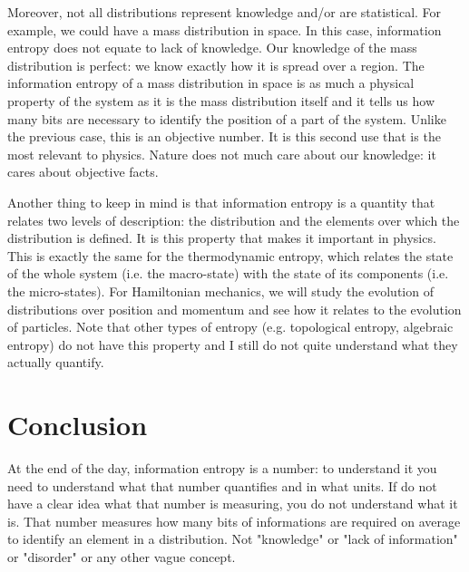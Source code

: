 \documentclass[aps,pra,10pt,floatfix,nofootinbib]{revtex4-1}
\theoremstyle{definition}
\begin{document}
Moreover, not all distributions represent knowledge and/or are statistical. For example, we could have a mass distribution in space. In this case, information entropy does not equate to lack of knowledge. Our knowledge of the mass distribution is perfect: we know exactly how it is spread over a region. The information entropy of a mass distribution in space is as much a physical property of the system as it is the mass distribution itself and it tells us how many bits are necessary to identify the position of a part of the system. Unlike the previous case, this is an objective number. It is this second use that is the most relevant to physics. Nature does not much care about our knowledge: it cares about objective facts.

Another thing to keep in mind is that information entropy is a quantity that relates two levels of description: the distribution and the elements over which the distribution is defined. It is this property that makes it important in physics. This is exactly the same for the thermodynamic entropy, which relates the state of the whole system (i.e. the macro-state) with the state of its components (i.e. the micro-states). For Hamiltonian mechanics, we will study the evolution of distributions over position and momentum and see how it relates to the evolution of particles. Note that other types of entropy (e.g. topological entropy, algebraic entropy) do not have this property and I still do not quite understand what they actually quantify.

\section{Conclusion}

At the end of the day, information entropy is a number: to understand it you need to understand what that number quantifies and in what units. If do not have a clear idea what that number is measuring, you do not understand what it is. That number measures how many bits of informations are required on average to identify an element in a distribution. Not "knowledge" or "lack of information" or "disorder" or any other vague concept. 
\end{document}
